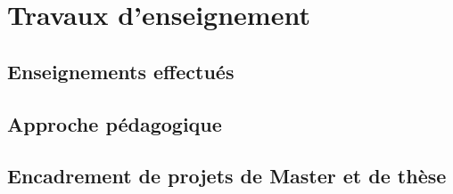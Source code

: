 


\chapter{Travaux d'enseignement} 

\section{Enseignements effectu\'es}

\pg


\section{Approche p\'edagogique}

\pg



\section{Encadrement de projets de Master et de th\`ese}